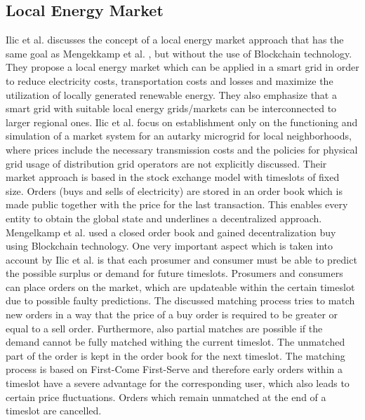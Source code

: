 \documentclass[runningheads]{llncs}
\begin{document}
\subsection{Local Energy Market}
Ilic et al. \cite{ilic_smart_grid_neighbourhoods} discusses the concept of a local energy market approach that has the same goal as Mengekkamp et al. \cite{mengelkamp_lem}, but without the use of Blockchain technology. They propose a local energy market which can be applied in a smart grid in order to reduce electricity costs, transportation costs and losses and maximize the utilization of locally generated renewable energy. They also emphasize that a smart grid with suitable local energy grids/markets can be interconnected to larger regional ones.\newline
Ilic et al. \cite{ilic_smart_grid_neighbourhoods} focus on establishment only on the functioning and simulation of a market system for an autarky microgrid  for local neighborhoods, where prices include the necessary transmission costs and the policies for physical grid usage of distribution grid operators are not explicitly discussed.  
Their market approach is based in the stock exchange model with timeslots of fixed size. Orders (buys and sells of electricity) are stored in an order book which is made public together with the price for the last transaction. This enables every entity to obtain the global state and underlines a decentralized approach. Mengelkamp et al. \cite{mengelkamp_lem} used a closed order book and gained decentralization buy using Blockchain technology. One very important aspect which is taken into account by Ilic et al. \cite{ilic_smart_grid_neighbourhoods} is that each prosumer and consumer must be able to predict the possible surplus or demand for future timeslots. Prosumers and consumers can place orders on the market, which are updateable within the certain timeslot due to possible faulty predictions. The discussed matching process tries to match new orders in a way that the price of a buy order is required to be greater or equal to a sell order. Furthermore, also partial matches are possible if the demand cannot be fully matched withing the current timeslot. The unmatched part of the order is kept in the order book for the next timeslot. The matching process is based on First-Come First-Serve and therefore early orders within a timeslot have a severe advantage for the corresponding user, which also leads to certain price fluctuations. Orders which remain unmatched at the end of a timeslot are cancelled. \newline
\end{document}
